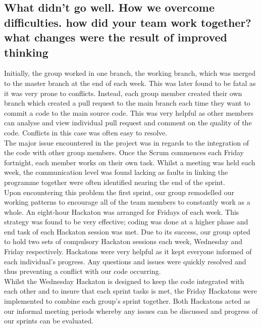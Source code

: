 \documentclass{article}[11pt,Tahoma]
\begin{document}
\begin{Abstract}
		\subsection{What didn't go well. How we overcome difficulties. how did your team work together? what changes were the result of improved thinking }	
			Initially, the group worked in one branch, the working branch, which was merged to the master branch at the end of each week. This was later found to be fatal as it was very prone to conflicts.  Instead, each group member created their own branch which created a pull request to the main branch each time they want to commit a code to the main source code. This was very helpful as other members can analyse and view individual pull request and comment on the quality of the code.  Conflicts in this case was often easy to resolve.\\ 
			The major issue encountered in the project was in regards to the integration of the code with other group members. Once the Scrum commences each Friday fortnight, each member works on their own task.  Whilst a meeting was held each week, the communication level was found lacking as faults in linking the programme together were often identified nearing the end of the sprint.\\
			Upon encountering this problem the first sprint, our group remodelled our working patterns to encourage all of the team members to constantly work as a whole.  An eight-hour Hackaton was arranged for Fridays of each week.  This strategy was found to be very effective; coding was done at a higher phase and end task of each Hackaton session was met.  Due to its success, our group opted to hold two sets of compulsory Hackaton sessions each week, Wednesday and Friday respectively.  Hackatons were very helpful as it kept everyone informed of each individual's progress. Any questions and issues were quickly resolved and thus preventing a conflict with our code occurring.\\
			Whilst the Wednesday Hackaton is designed to keep the code integrated with each other and to insure that each sprint tasks is met, the Friday Hackatons were implemented to combine each group's sprint together. Both Hackatons acted as our informal meeting periods whereby any issues can be discussed and progress of our sprints can be evaluated.

\end{Abstract}
\end{document}
